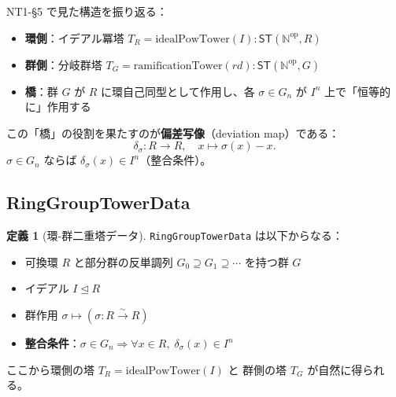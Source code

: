 \documentclass[a4paper,11pt]{ltjsarticle}
\theoremstyle{definition}
\newtheorem{definition}{定義}[section]
\theoremstyle{plain}
\theoremstyle{remark}
\newcommand{\ST}{\mathsf{ST}}
\newcommand{\OD}{\mathbb{N}^{\mathrm{op}}}
\begin{document}
NT1-\S5 で見た構造を振り返る：
\begin{itemize}
  \item \textbf{環側}：イデアル冪塔 $T_R = \mathrm{idealPowTower}(I) : \ST(\OD, R)$
  \item \textbf{群側}：分岐群塔 $T_G = \mathrm{ramificationTower}(rd) : \ST(\OD, G)$
  \item \textbf{橋}：群 $G$ が $R$ に環自己同型として作用し、各 $\sigma \in G_n$ が
        $I^n$ 上で「恒等的に」作用する
\end{itemize}

この「橋」の役割を果たすのが\textbf{偏差写像}（deviation map）である：
\[
\delta_\sigma : R \to R, \quad x \mapsto \sigma(x) - x.
\]
$\sigma \in G_n$ ならば $\delta_\sigma(x) \in I^n$（整合条件）。

\subsection{RingGroupTowerData}

\begin{definition}[環-群二重塔データ]
\texttt{RingGroupTowerData} は以下からなる：
\begin{itemize}
  \item 可換環 $R$ と部分群の反単調列 $G_0 \supseteq G_1 \supseteq \cdots$ を持つ群 $G$
  \item イデアル $I \trianglelefteq R$
  \item 群作用 $\sigma \mapsto (\sigma : R \xrightarrow{\sim} R)$
  \item \textbf{整合条件}：$\sigma \in G_n \Rightarrow \forall x \in R,\; \delta_\sigma(x) \in I^n$
\end{itemize}
ここから環側の塔 $T_R = \mathrm{idealPowTower}(I)$ と
群側の塔 $T_G$ が自然に得られる。
\end{definition}
\end{document}
